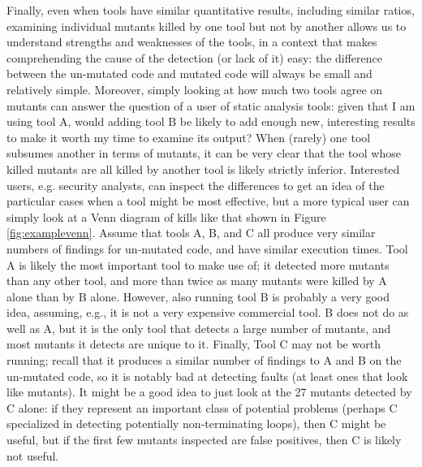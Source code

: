 Finally, even when tools have similar quantitative results, including similar ratios, examining individual mutants killed by one tool but not by another allows us to understand strengths and weaknesses of the tools, in a context that makes comprehending the cause of the detection (or lack of it) easy: the difference between the un-mutated code and mutated code will always be small and relatively simple.  Moreover, simply looking at how much two tools agree on mutants can answer the question of a user of static analysis tools: given that I am using tool A, would adding tool B be likely to add enough new, interesting results to make it worth my time to examine its output?  When (rarely) one tool subsumes another in terms of mutants, it can be very clear that the tool whose killed mutants are all killed by another tool is likely strictly inferior.  Interested users, e.g. security analysts, can inspect the differences to get an idea of the particular cases when a tool might be most effective, but a more typical user can simply look at a Venn diagram of kills like that shown in Figure \ref{fig:examplevenn}.  Assume that tools A, B, and C all produce very similar numbers of findings for un-mutated code, and have similar execution times.  Tool A is likely the most important tool to make use of; it detected more mutants than any other tool, and more than twice as many mutants were killed by A alone than by B alone.  However, also running tool B is probably a very good idea, assuming, e.g., it is not a very expensive commercial tool.  B does not do as well as A, but it is the only tool that detects a large number of mutants, and most mutants it detects are unique to it.  Finally, Tool C may not be worth running; recall that it produces a similar number of findings to A and B on the un-mutated code, so it is notably bad at detecting faults (at least ones that look like mutants).  It might be a good idea to just look at the 27 mutants detected by C alone:  if they represent an important class of potential problems (perhaps C specialized in detecting potentially non-terminating loops), then C might be useful, but if the first few mutants inspected are false positives, then C is likely not useful.

